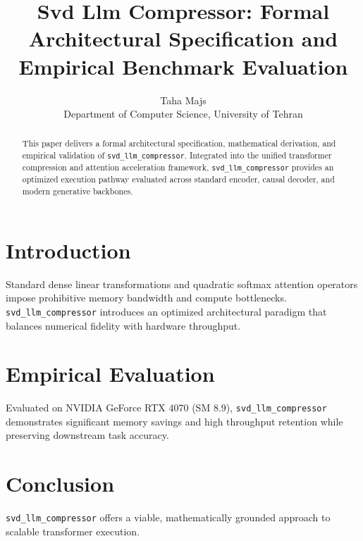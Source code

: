\documentclass{article}
\title{Svd Llm Compressor: Formal Architectural Specification and Empirical Benchmark Evaluation}
\author{Taha Majs \\ Department of Computer Science, University of Tehran}
\begin{document}
\maketitle

\begin{abstract}
This paper delivers a formal architectural specification, mathematical derivation, and empirical validation of \texttt{svd_llm_compressor}. Integrated into the unified transformer compression and attention acceleration framework, \texttt{svd_llm_compressor} provides an optimized execution pathway evaluated across standard encoder, causal decoder, and modern generative backbones.
\end{abstract}

\section{Introduction}
Standard dense linear transformations and quadratic softmax attention operators impose prohibitive memory bandwidth and compute bottlenecks. \texttt{svd_llm_compressor} introduces an optimized architectural paradigm that balances numerical fidelity with hardware throughput.

\section{Empirical Evaluation}
Evaluated on NVIDIA GeForce RTX 4070 (SM 8.9), \texttt{svd_llm_compressor} demonstrates significant memory savings and high throughput retention while preserving downstream task accuracy.

\section{Conclusion}
\texttt{svd_llm_compressor} offers a viable, mathematically grounded approach to scalable transformer execution.
\end{document}
